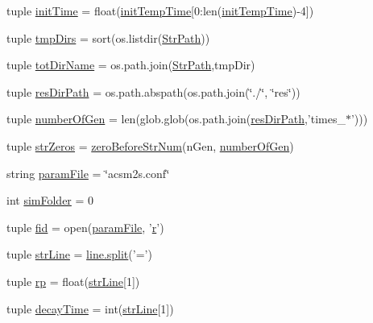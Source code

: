 \begin{DoxyCompactItemize}
\item 
tuple \hyperlink{a00096_a826c1b0585b4e8474c76f92bd7583836}{init\-Time} = float(\hyperlink{a00096_adc4403c4cfe080918c8b9da692c50509}{init\-Temp\-Time}\mbox{[}0\-:len(\hyperlink{a00096_adc4403c4cfe080918c8b9da692c50509}{init\-Temp\-Time})-\/4\mbox{]})
\item 
tuple \hyperlink{a00096_ace4c571efd2e5ecd266ce5701f761a83}{tmp\-Dirs} = sort(os.\-listdir(\hyperlink{a00096_af8add8b37a9c8a7825c0e8f0e7dfd6c1}{Str\-Path}))
\item 
tuple \hyperlink{a00096_a5903034df3d32525785e697152efbeb3}{tot\-Dir\-Name} = os.\-path.\-join(\hyperlink{a00096_af8add8b37a9c8a7825c0e8f0e7dfd6c1}{Str\-Path},tmp\-Dir)
\item 
tuple \hyperlink{a00096_a9ededb3cd7c63befde39ad68e5f9e006}{res\-Dir\-Path} = os.\-path.\-abspath(os.\-path.\-join(\char`\"{}./\char`\"{}, \char`\"{}res\char`\"{}))
\item 
tuple \hyperlink{a00096_a9a81829f850e2e125e3c94214da7a1f0}{number\-Of\-Gen} = len(glob.\-glob(os.\-path.\-join(\hyperlink{a00096_a9ededb3cd7c63befde39ad68e5f9e006}{res\-Dir\-Path},'times\-\_\-$\ast$')))
\item 
tuple \hyperlink{a00096_a8ba6aefb71b3d1e575eac38627f143d6}{str\-Zeros} = \hyperlink{a00096_ab46df2a2027edcf1b07fc012b691b9d6}{zero\-Before\-Str\-Num}(n\-Gen, \hyperlink{a00096_a9a81829f850e2e125e3c94214da7a1f0}{number\-Of\-Gen})
\item 
string \hyperlink{a00096_a7160f8e48b4aafebbd75e9037fc9fef7}{param\-File} = \char`\"{}acsm2s.\-conf\char`\"{}
\item 
int \hyperlink{a00096_a58095f64afeda893517e81226e1963c3}{sim\-Folder} = 0
\item 
tuple \hyperlink{a00096_a424e2204e89264a827e6cad861ebcbc1}{fid} = open(\hyperlink{a00096_a7160f8e48b4aafebbd75e9037fc9fef7}{param\-File}, '\hyperlink{a00025_ac862e7284527eb913b1351c8bfb8e079}{r}')
\item 
tuple \hyperlink{a00096_a072631e11db72789389935b0f9efff8d}{str\-Line} = \hyperlink{a00070_a4d1aa74fac80ae0275c056575fdb6626}{line.\-split}('=')
\item 
tuple \hyperlink{a00096_a98150f532e09ebae495212500d2f1799}{rp} = float(\hyperlink{a00096_a072631e11db72789389935b0f9efff8d}{str\-Line}\mbox{[}1\mbox{]})
\item 
tuple \hyperlink{a00096_a80a6d3cf3f4ccdc596054300761972a9}{decay\-Time} = int(\hyperlink{a00096_a072631e11db72789389935b0f9efff8d}{str\-Line}\mbox{[}1\mbox{]})
\item 

\end{DoxyCompactItemize}
